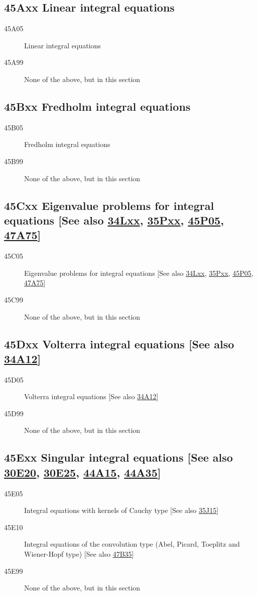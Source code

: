 \documentclass[letterpaper]{article}
\begin{document}
\subsection*{45Axx  Linear integral equations }\label{45Axx}
\begin{description}
\item [45A05]\label{45A05} Linear integral equations
\item [45A99]\label{45A99} None of the above, but in this section
\end{description}
\subsection*{45Bxx  Fredholm integral equations }\label{45Bxx}
\begin{description}  
\item [45B05]\label{45B05} Fredholm integral equations
\item [45B99]\label{45B99} None of the above, but in this section
\end{description}
\subsection*{45Cxx  Eigenvalue problems for integral equations [See also \hyperref[34Lxx]{34Lxx}, \hyperref[35Pxx]{35Pxx}, \hyperref[45P05]{45P05}, \hyperref[47A75]{47A75}] }\label{45Cxx}
\begin{description}  
\item [45C05]\label{45C05} Eigenvalue problems for integral equations [See also \hyperref[34Lxx]{34Lxx}, \hyperref[35Pxx]{35Pxx}, \hyperref[45P05]{45P05}, \hyperref[47A75]{47A75}]
\item [45C99]\label{45C99} None of the above, but in this section
\end{description}
\subsection*{45Dxx  Volterra integral equations [See also \hyperref[34A12]{34A12}] }\label{45Dxx}
\begin{description}  
\item [45D05]\label{45D05} Volterra integral equations [See also \hyperref[34A12]{34A12}]
\item [45D99]\label{45D99} None of the above, but in this section
\end{description}
\subsection*{45Exx  Singular integral equations [See also \hyperref[30E20]{30E20}, \hyperref[30E25]{30E25}, \hyperref[44A15]{44A15}, \hyperref[44A35]{44A35}] }\label{45Exx}
\begin{description}  
\item [45E05]\label{45E05} Integral equations with kernels of Cauchy type [See also \hyperref[35J15]{35J15}]
\item [45E10]\label{45E10} Integral equations of the convolution type (Abel, Picard, Toeplitz and Wiener-Hopf type) [See also \hyperref[47B35]{47B35}]
\item [45E99]\label{45E99} None of the above, but in this section
\end{description}
\end{document}
